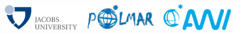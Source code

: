 \documentclass[8pt]{beamer}
\begin{document}
\setwatermark{\fontsize{125pt}{125pt}\selectfont{}}
\begin{frame}{}
	\begin{center}
		\includegraphics[width=0.9\textwidth]{./img/logos.pdf}\\~\\
	\end{center}
\end{frame}
\end{document}
